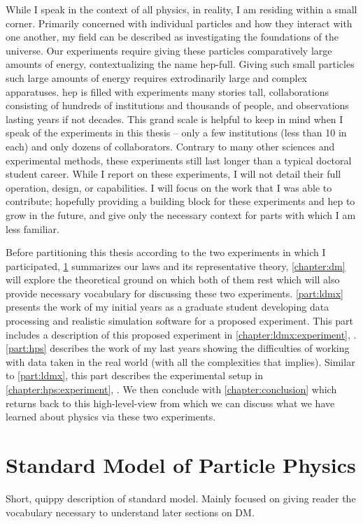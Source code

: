 While I speak in the context of all physics, in reality, I am residing within a small corner.
Primarily concerned with individual particles and how they interact with one another, my field
can be described as investigating the foundations of the universe. Our experiments require giving
these particles comparatively large amounts of energy, contextualizing the name \gls{hep-full}.
Giving such small particles such large amounts of energy requires extrodinarily large and complex
apparatuses. \gls{hep} is filled with experiments many stories tall, collaborations consisting
of hundreds of institutions and thousands of people, and observations lasting years if not decades.
This grand scale is helpful to keep in mind when I speak of the experiments in this thesis -- only
a few institutions (less than 10 in each) and only dozens of collaborators. Contrary to many other
sciences and experimental methods, these experiments still last longer than a typical doctoral
student career. While I report on these experiments, I will not detail their full operation, design,
or capabilities. I will focus on the work that I was able to contribute; hopefully providing a
building block for these experiments and \gls{hep} to grow in the future, and give only the necessary
context for parts with which I am less familiar.

Before partitioning this thesis according to the two experiments in which I participated,
\cref{sec:sm} summarizes our laws and its representative theory,
\cref{chapter:dm} will explore the theoretical ground on which both of them rest which will
also provide necessary vocabulary for discussing these two experiments. \cref{part:ldmx} presents
the work of my initial years as a graduate student developing data processing and realistic simulation
software for a proposed experiment. This part includes a description of this proposed experiment in
\cref{chapter:ldmx:experiment}, .
\cref{part:hps} describes the work of my last years showing
the difficulties of working with data taken in the real world (with all the complexities that implies).
Similar to \cref{part:ldmx}, this part describes the experimental setup in \cref{chapter:hps:experiment},
.
We then conclude with \cref{chapter:conclusion} which returns back to this high-level-view
from which we can discuss what we have learned about physics via these two experiments.

\section{Standard Model of Particle Physics}
\label{sec:sm}
Short, quippy description of standard model. Mainly focused on giving reader the vocabulary necessary
to understand later sections on DM.

